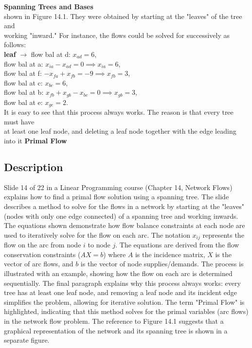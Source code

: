 \documentclass{article}%
\begin{document}
\textbf{Spanning Trees and Bases} \\
shown in Figure 14.1. They were obtained by starting at the "leaves" of the tree and \\
working "inward." For instance, the flows could be solved for successively as follows: \\
\textbf{leaf} $\to$ flow bal at d: $x_{ad} = 6$, \\
flow bal at a: $x_{ia} - x_{ad} = 0 \implies x_{ia} = 6$, \\
flow bal at f: $-x_{fa} + x_{fb} = -9 \implies x_{fb} = 3$, \\
flow bal at c: $x_{bc} = 6$, \\
flow bal at b: $x_{fb} + x_{gb} - x_{bc} = 0 \implies x_{gb} = 3$, \\
flow bal at e: $x_{ge} = 2$. \\
It is easy to see that this process always works. The reason is that every tree must have \\
at least one leaf node, and deleting a leaf node together with the edge leading into it
\textbf{Primal Flow}
%
\subsection{Description}%
Slide 14 of 22 in a Linear Programming course (Chapter 14, Network Flows) explains how to find a primal flow solution using a spanning tree. The slide describes a method to solve for the flows in a network by starting at the "leaves" (nodes with only one edge connected) of a spanning tree and working inwards.  The equations shown demonstrate how flow balance constraints at each node are used to iteratively solve for the flow on each arc.  The notation $x_{ij}$ represents the flow on the arc from node $i$ to node $j$.  The equations are derived from the flow conservation constraints ($AX = b$) where $A$ is the incidence matrix, $X$ is the vector of arc flows, and $b$ is the vector of node supplies/demands. The process is illustrated with an example, showing how the flow on each arc is determined sequentially. The final paragraph explains why this process always works: every tree has at least one leaf node, and removing a leaf node and its incident edge simplifies the problem, allowing for iterative solution. The term "Primal Flow" is highlighted, indicating that this method solves for the primal variables (arc flows) in the network flow problem. The reference to Figure 14.1 suggests that a graphical representation of the network and its spanning tree is shown in a separate figure.%
\end{document}
